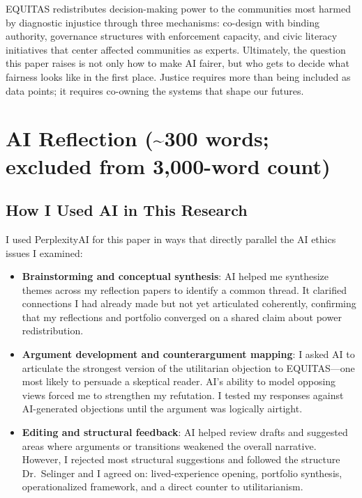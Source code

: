 \documentclass[12pt,a4paper]{article}
\begin{document}
\vspace{0.5em}
EQUITAS redistributes decision-making power to the communities most harmed by diagnostic injustice through three mechanisms: co-design with binding authority, governance structures with enforcement capacity, and civic literacy initiatives that center affected communities as experts. Ultimately, the question this paper raises is not only how to make AI fairer, but who gets to decide what fairness looks like in the first place. Justice requires more than being included as data points; it requires co-owning the systems that shape our futures.



\newpage
\section{AI Reflection (\texorpdfstring{\textasciitilde}{~}300 words; excluded from 3,000-word count)}

\subsection{How I Used AI in This Research}

I used PerplexityAI for this paper in ways that directly parallel the AI ethics issues I examined:

\begin{itemize}
    \setlength\itemsep{0.1em}
    \item \textbf{Brainstorming and conceptual synthesis}: AI helped me synthesize themes across my reflection papers to identify a common thread. It clarified connections I had already made but not yet articulated coherently, confirming that my reflections and portfolio converged on a shared claim about power redistribution.
    
    \item \textbf{Argument development and counterargument mapping}: I asked AI to articulate the strongest version of the utilitarian objection to EQUITAS—one most likely to persuade a skeptical reader. AI’s ability to model opposing views forced me to strengthen my refutation. I tested my responses against AI-generated objections until the argument was logically airtight.
    
    \item \textbf{Editing and structural feedback}: AI helped review drafts and suggested areas where arguments or transitions weakened the overall narrative. However, I rejected most structural suggestions and followed the structure Dr.\ Selinger and I agreed on: lived-experience opening, portfolio synthesis, operationalized framework, and a direct counter to utilitarianism.
\end{itemize}
\end{document}
